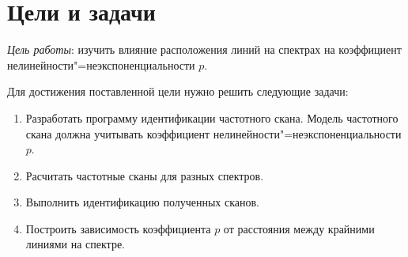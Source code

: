 \section{Цели и задачи}

\emph{Цель работы}: изучить влияние расположения линий на спектрах на 
коэффициент нелинейности"=неэкспоненциальности $p$.

Для достижения поставленной цели нужно решить следующие задачи:
\begin{enumerate}
    \item Разработать программу идентификации частотного скана. Модель
    частотного скана должна учитывать коэффициент 
    нелинейности"=неэкспоненциальности $p$.
    \item Расчитать частотные сканы для разных спектров.
    \item Выполнить идентификацию полученных сканов.
    \item Построить зависимость коэффициента $p$ от расстояния между 
    крайними линиями на спектре.
\end{enumerate}